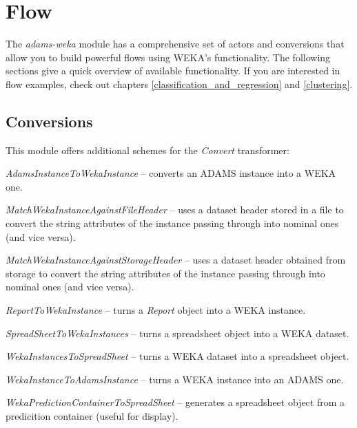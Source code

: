 %

\chapter{Flow}
The \textit{adams-weka} module has a comprehensive set of actors and conversions
that allow you to build powerful flows using WEKA's functionality. The following
sections give a quick overview of available functionality. If you are interested
in flow examples, check out chapters \ref{classification_and_regression} and
\ref{clustering}.

\section{Conversions}
This module offers additional schemes for the \textit{Convert} transformer:
\begin{tight_itemize}
	\item \textit{AdamsInstanceToWekaInstance} -- converts an ADAMS instance
	into a WEKA one.
	\item \textit{MatchWekaInstanceAgainstFileHeader} -- uses a dataset header
	stored in a file to convert the string attributes of the instance passing 
	through into nominal ones (and vice versa).
	\item \textit{MatchWekaInstanceAgainstStorageHeader} -- uses a dataset
	header obtained from storage to convert the string attributes of the 
	instance passing through into nominal ones (and vice versa).
	\item \textit{ReportToWekaInstance} -- turns a \textit{Report} object
	into a WEKA instance.
	\item \textit{SpreadSheetToWekaInstances} -- turns a spreadsheet object
	into a WEKA dataset.
	\item \textit{WekaInstancesToSpreadSheet} -- turns a WEKA dataset into
	a spreadsheet object.
	\item \textit{WekaInstanceToAdamsInstance} -- turns a WEKA instance into
	an ADAMS one.
	\item \textit{WekaPredictionContainerToSpreadSheet} -- generates a 
	spreadsheet object from a predicition container (useful for display).
\end{tight_itemize}

